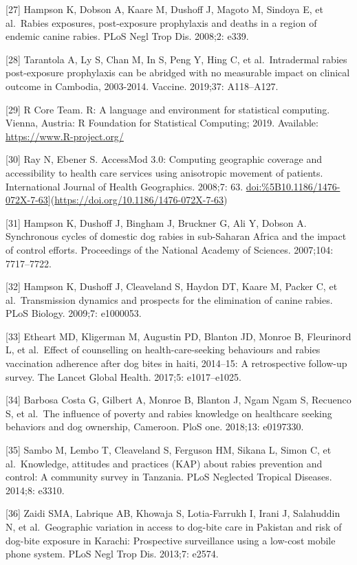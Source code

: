 \documentclass[
  oneside]{book}
\begin{document}
{[}27{]} Hampson K, Dobson A, Kaare M, Dushoff J, Magoto M, Sindoya E, et
al.~Rabies exposures, post-exposure prophylaxis and deaths in a region
of endemic canine rabies. PLoS Negl Trop Dis. 2008;2: e339.

{[}28{]} Tarantola A, Ly S, Chan M, In S, Peng Y, Hing C, et al.~Intradermal
rabies post-exposure prophylaxis can be abridged with no measurable
impact on clinical outcome in Cambodia, 2003-2014. Vaccine. 2019;37:
A118--A127.

{[}29{]} R Core Team. R: A language and environment for statistical
computing. Vienna, Austria: R Foundation for Statistical Computing;
2019. Available: \url{https://www.R-project.org/}

{[}30{]} Ray N, Ebener S. AccessMod 3.0: Computing geographic coverage and
accessibility to health care services using anisotropic movement of
patients. International Journal of Health Geographics. 2008;7: 63.
\url{doi:\%5B10.1186/1476-072X-7-63}{]}(\url{https://doi.org/10.1186/1476-072X-7-63})

{[}31{]} Hampson K, Dushoff J, Bingham J, Bruckner G, Ali Y, Dobson A.
Synchronous cycles of domestic dog rabies in sub-Saharan Africa and the
impact of control efforts. Proceedings of the National Academy of
Sciences. 2007;104: 7717--7722.

{[}32{]} Hampson K, Dushoff J, Cleaveland S, Haydon DT, Kaare M, Packer C,
et al.~Transmission dynamics and prospects for the elimination of canine
rabies. PLoS Biology. 2009;7: e1000053.

{[}33{]} Etheart MD, Kligerman M, Augustin PD, Blanton JD, Monroe B,
Fleurinord L, et al.~Effect of counselling on health-care-seeking
behaviours and rabies vaccination adherence after dog bites in haiti,
2014--15: A retrospective follow-up survey. The Lancet Global Health.
2017;5: e1017--e1025.

{[}34{]} Barbosa Costa G, Gilbert A, Monroe B, Blanton J, Ngam Ngam S,
Recuenco S, et al.~The influence of poverty and rabies knowledge on
healthcare seeking behaviors and dog ownership, Cameroon. PloS one.
2018;13: e0197330.

{[}35{]} Sambo M, Lembo T, Cleaveland S, Ferguson HM, Sikana L, Simon C, et
al.~Knowledge, attitudes and practices (KAP) about rabies prevention and
control: A community survey in Tanzania. PLoS Neglected Tropical
Diseases. 2014;8: e3310.

{[}36{]} Zaidi SMA, Labrique AB, Khowaja S, Lotia-Farrukh I, Irani J,
Salahuddin N, et al.~Geographic variation in access to dog-bite care in
Pakistan and risk of dog-bite exposure in Karachi: Prospective
surveillance using a low-cost mobile phone system. PLoS Negl Trop Dis.
2013;7: e2574.
\end{document}
